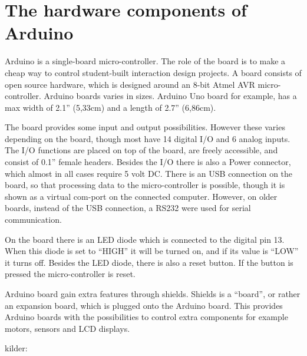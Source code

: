 \chapter{The hardware components of Arduino}
Arduino is a single-board micro-controller.
The role of the board is to make a cheap way to control student-built interaction design projects. A board consists of open source hardware, which is designed around an 8-bit Atmel AVR micro-controller. Arduino boards varies in sizes. Arduino Uno board for example, has a max width of 2.1'' (5,33cm) and a length of 2.7'' (6,86cm). 

The board provides some input and output possibilities. However these varies depending on the board, though most have 14 digital I/O and 6 analog inputs. The I/O functions are placed on top of the board, are freely accessible, and consist of 0.1'' female headers. Besides the I/O there is also a Power connector, which almost in all cases require 5 volt DC. There is an USB connection on the board, so that processing data to the micro-controller is possible, though it is shown as a virtual com-port on the connected computer. However, on older boards, instead of the USB connection, a RS232 were used for serial communication. 

On the board there is an LED diode which is connected to the digital pin 13. When this diode is set to ``HIGH'' it will be turned on, and if its value is ``LOW'' it turns off. Besides the LED diode, there is also a reset button. If the button is pressed the micro-controller is reset. 

Arduino board gain extra features through shields. Shields is a ``board'', or rather an expansion board, which is plugged onto the Arduino board. This provides Arduino boards with the possibilities to control extra components for example motors, sensors and LCD displays.

kilder:
%
